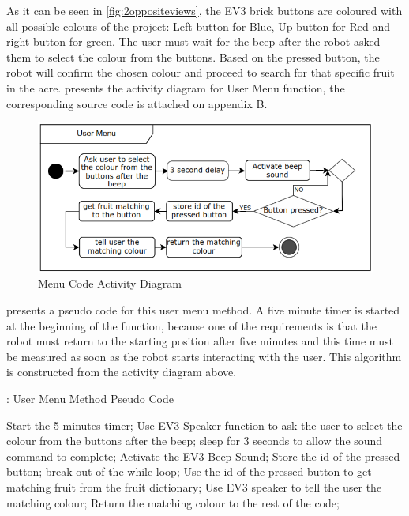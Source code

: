 \noindent As it can be seen in \vref{fig:2oppositeviews}, the EV3 brick buttons are coloured with all possible colours of the project: Left button for Blue, Up button for Red and right button for green. The user must wait for the beep after the robot asked them to select the colour from the buttons. Based on the pressed button, the robot will confirm the chosen colour and proceed to search for that specific fruit in the acre.  presents the activity diagram for User Menu function, the corresponding source code is attached on appendix B.

\begin{figure}[!ht]
	\centering
	\includegraphics[width=\linewidth]{Graphics/menuCodeActivityDiagram}
	\caption{Menu Code Activity Diagram}
	\label{fig:menuCodeActivityDiagram}
\end{figure}

\noindent {} presents a pseudo code for this user menu method. A five minute timer is started at the beginning of the function, because one of the requirements is that the robot must return to the starting position after five minutes and this time must be measured as soon as the robot starts interacting with the user. This algorithm is constructed from the activity diagram above.

\begin{algorithm}
	\caption{: User Menu Method Pseudo Code}\label{menuPseudo}
	\begin{algorithmic}[1]
		\State Start the 5 minutes timer;
		\State Use EV3 Speaker function to ask the user to select the colour from the buttons after the beep;
		\State sleep for 3 seconds to allow the sound command to complete;
		\State Activate the EV3 Beep Sound;
		\State Store the id of the pressed button;
		\State break out of the while loop;
		\EndIf
		\EndWhile
		\State Use the id of the pressed button to get matching fruit from the fruit dictionary;
		\State Use EV3 speaker to tell the user the matching colour;
		\State Return the matching colour to the rest of the code;
	\end{algorithmic}
\end{algorithm}




